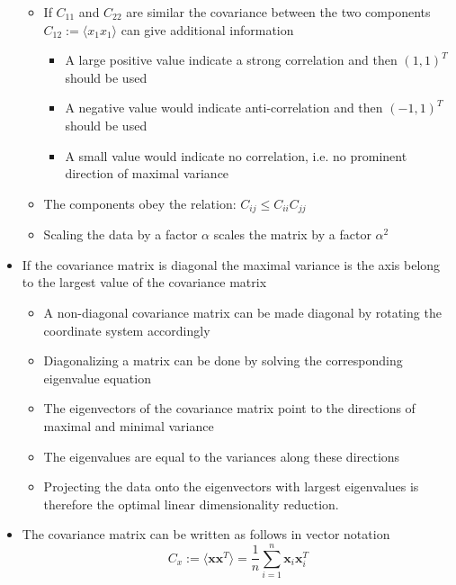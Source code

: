 \documentclass[a4, english]{article}
\begin{document}
\begin{itemize}
\begin{itemize}
\begin{itemize}
    \end{itemize}
    \item If $C_{11}$ and $C_{22}$ are similar the covariance between the two components $C_{12} := \langle x_1x_1 \rangle$ can give additional information
    \begin{itemize}
      \item A large positive value indicate a strong correlation and then $(1,1)^T$ should be used
      \item A negative value would indicate anti-correlation and then $(-1,1)^T$ should be used
      \item A small value would indicate no correlation, i.e. no prominent direction of maximal variance
    \end{itemize}

    \item The components obey the relation: $C_{ij} \leq C_{ii} C_{jj}$
  	\item Scaling the data by a factor $\alpha$ scales the matrix by a factor $\alpha^2$ 
  \end{itemize}
  \item If the covariance matrix is diagonal the maximal variance is the axis belong to the largest value of the covariance matrix 
  \begin{itemize}
  	\item A non-diagonal covariance matrix can be made diagonal by rotating the coordinate system accordingly
    \item Diagonalizing a matrix can be done by solving the corresponding eigenvalue equation
    \item The eigenvectors of the covariance matrix point to the directions of maximal and minimal variance
    \item The eigenvalues are equal to the variances along these directions
  	\item Projecting the data onto the eigenvectors with largest eigenvalues is therefore the optimal linear dimensionality reduction. 
  \end{itemize}
  \item The covariance matrix can be written as follows in vector notation
  \begin{equation*}
    C_x := \langle \pmb x \pmb x^T \rangle = \frac1n \sum_{i=1}^n \pmb x_i \pmb x_i^T
  \end{equation*}
\end{itemize}
\end{document}
